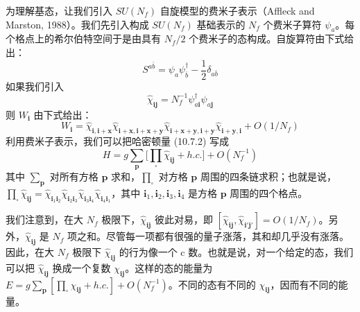 为理解基态，让我们引入 $SU(N_f)$ 自旋模型的费米子表示（Affleck and Marston, 1988）。我们先引入构成 $SU(N_f)$ 基础表示的 $N_f$ 个费米子算符 $\psi_a$。每个格点上的希尔伯特空间于是由具有 $N_f/2$ 个费米子的态构成。自旋算符由下式给出：
\begin{equation*}
S^{a\bar b}=\psi_a\psi^{\dagger}_{\bar b}-\frac{1}{2}\delta_{a\bar b}
\end{equation*}
如果我们引入
\begin{equation*}
\hat\chi_{\pmb i\pmb j}=N_f^{-1}\psi^{\dagger}_{a\pmb i}\psi_{a\pmb j}
\end{equation*}
则 $W_{\pmb i}$ 由下式给出：
\begin{equation*}
W_{\pmb i}=\hat\chi_{\pmb i,\pmb i+\pmb x}\hat\chi_{\pmb i+\pmb x,\pmb i+\pmb x+\pmb y}\hat\chi_{\pmb i+\pmb x+\pmb y,\pmb i+\pmb y}\hat\chi_{\pmb i+\pmb y,\pmb i}+O(1/N_f)
\end{equation*}
利用费米子表示，我们可以把哈密顿量 (10.7.2) 写成
\begin{equation*}
H=g\sum_{\pmb p}\Big[\prod_{\square}\hat\chi_{\pmb i\pmb j}+h.c.\Big]+O(N_f^{-1})\tag{10.7.3}
\end{equation*}
其中 $\sum_{\pmb p}$ 对所有方格 $\pmb p$ 求和，$\prod_{\square}$ 对方格 $\pmb p$ 周围的四条链求积；也就是说，$\prod_{\square}\hat\chi_{\pmb i\pmb j}\allowbreak=\hat\chi_{\pmb i_1\pmb i_2}\allowbreak\hat\chi_{\pmb i_2\pmb i_3}\allowbreak\hat\chi_{\pmb i_3\pmb i_4}\allowbreak\hat\chi_{\pmb i_4\pmb i_1}$，其中 $\pmb i_1,\pmb i_2,\pmb i_3,\pmb i_4$ 是方格 $\pmb p$ 周围的四个格点。

我们注意到，在大 $N_f$ 极限下，$\hat\chi_{\pmb i\pmb j}$ 彼此对易，即 $[\hat\chi_{\pmb i\pmb j},\hat\chi_{\pmb i'\pmb j'}]=O(1/N_f)$。另外，$\hat\chi_{\pmb i\pmb j}$ 是 $N_f$ 项之和。尽管每一项都有很强的量子涨落，其和却几乎没有涨落。因此，在大 $N_f$ 极限下 $\hat\chi_{\pmb i\pmb j}$ 的行为像一个 c 数。也就是说，对一个给定的态，我们可以把 $\hat\chi_{\pmb i\pmb j}$ 换成一个复数 $\chi_{\pmb i\pmb j}$。这样的态的能量为 $E=g\sum_{\pmb p}[\prod_{\square}\chi_{\pmb i\pmb j}+h.c.]+O(N_f^{-1})$。不同的态有不同的 $\chi_{\pmb i\pmb j}$，因而有不同的能量。


